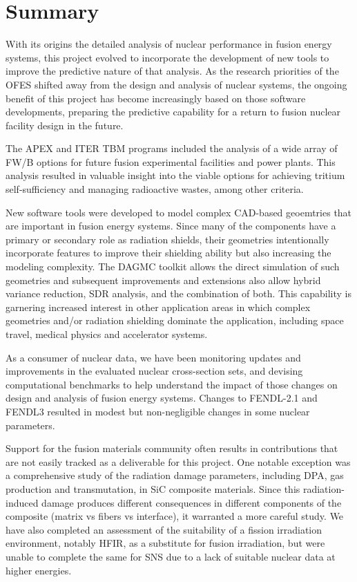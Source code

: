 \chapter{Summary}

With its origins the detailed analysis of nuclear performance in fusion energy
systems, this project evolved to incorporate the development of new tools to
improve the predictive nature of that analysis.  As the research priorities of
the \gls{OFES} shifted away from the design and analysis of nuclear systems,
the ongoing benefit of this project has become increasingly based on those
software developments, preparing the predictive capability for a return to
fusion nuclear facility design in the future.

The \gls{APEX} and ITER \gls{TBM} programs included the analysis of a wide
array of \gls{FW/B} options for future fusion experimental facilities and
power plants.  This analysis resulted in valuable insight into the viable
options for achieving tritium self-sufficiency and managing radioactive
wastes, among other criteria.

New software tools were developed to model complex \gls{CAD}-based geoemtries
that are important in fusion energy systems.  Since many of the components
have a primary or secondary role as radiation shields, their geometries
intentionally incorporate features to improve their shielding ability but also
increasing the modeling complexity.  The \gls{DAGMC} toolkit allows the direct
simulation of such geometries and subsequent improvements and extensions also
allow hybrid variance reduction, \gls{SDR} analysis, and the combination of
both.  This capability is garnering increased interest in other application
areas in which complex geometries and/or radiation shielding dominate the
application, including space travel, medical physics and accelerator systems.

As a consumer of nuclear data, we have been monitoring updates and
improvements in the evaluated nuclear cross-section sets, and devising
computational benchmarks to help understand the impact of those changes on
design and analysis of fusion energy systems.  Changes to \gls{FENDL}-2.1 and
\gls{FENDL}3 resulted in modest but non-negligible changes in some nuclear
parameters.

Support for the fusion materials community often results in contributions that
are not easily tracked as a deliverable for this project.  One notable
exception was a comprehensive study of the radiation damage parameters,
including DPA, gas production and transmutation, in SiC composite
materials.  Since this radiation-induced damage produces different
consequences in different components of the composite (matrix vs fibers vs
interface), it warranted a more careful study.  We have also completed an
assessment of the suitability of a fission irradiation environment, notably
\gls{HFIR}, as a substitute for fusion irradiation, but were unable to
complete the same for \gls{SNS} due to a lack of suitable nuclear data at
higher energies.


